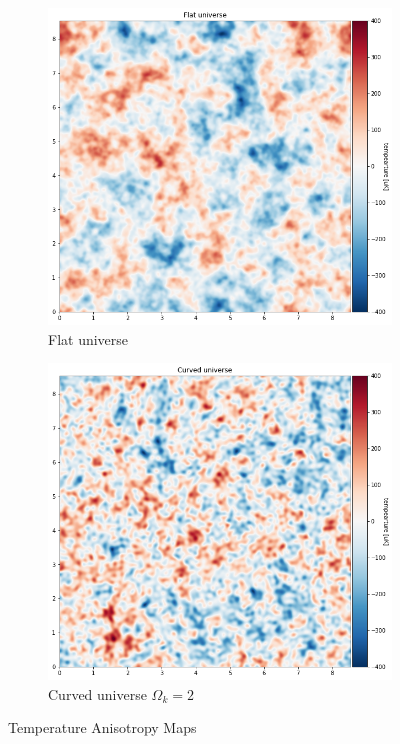 \documentclass[12pt]{article}
\begin{document}
\begin{figure}[H]
     \centering
     \begin{subfigure}[t]{0.49\textwidth}
         \centering
         \includegraphics[width=\textwidth]{images/flat temperature anisotropy map.png}
         \caption{Flat universe}
         \label{fig:my_label}
     \end{subfigure}
     \hfill
     \begin{subfigure}[t]{0.49\textwidth}
         \centering
         \includegraphics[width=\textwidth]{images/curved temperature anisotropy map.png}
         \caption{Curved universe $\Omega_k = 2$}
         \label{fig:my_label}
     \end{subfigure}
        \caption{Temperature Anisotropy Maps}
        \label{fig:my_label}
\end{figure}
\end{document}
